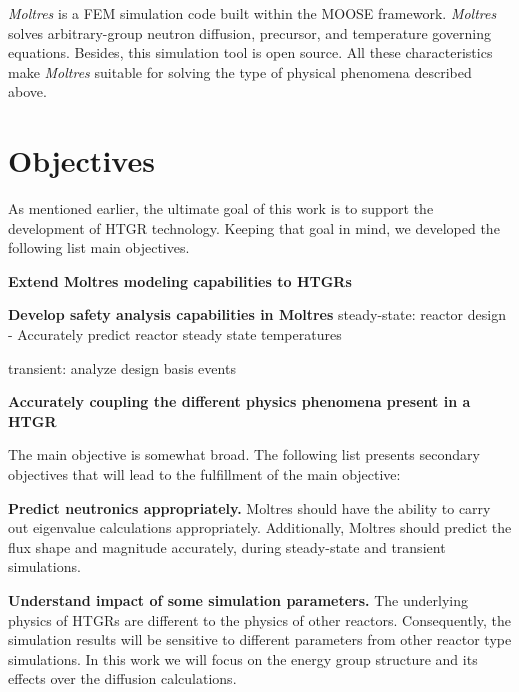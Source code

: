 \documentclass[11pt,letterpaper]{article}
\begin{document}
\textit{Moltres} \cite{lindsay_introduction_2018} is a \gls{FEM} simulation code built within the \gls{MOOSE} framework.
\textit{Moltres} solves arbitrary-group neutron diffusion, precursor, and temperature governing equations.
Besides, this simulation tool is open source.
All these characteristics make \textit{Moltres} suitable for solving the type of physical phenomena described above.

\section{Objectives}


As mentioned earlier, the ultimate goal of this work is to support the development of \gls{HTGR} technology.
Keeping that goal in mind, we developed the following list main objectives.


\textbf{Extend Moltres modeling capabilities to \glspl{HTGR}}

\textbf{Develop safety analysis capabilities in Moltres}
steady-state: reactor design
- Accurately predict reactor steady state temperatures

transient: analyze design basis events

\textbf{Accurately coupling the different physics phenomena present in a HTGR}



The main objective is somewhat broad.
The following list presents secondary objectives that will lead to the fulfillment of the main objective:

\textbf{Predict neutronics appropriately.}
Moltres should have the ability to carry out eigenvalue calculations appropriately.
Additionally, Moltres should predict the flux shape and magnitude accurately, during steady-state and transient simulations.

\textbf{Understand impact of some simulation parameters.}
The underlying physics of \glspl{HTGR} are different to the physics of other reactors.
Consequently, the simulation results will be sensitive to different parameters from other reactor type simulations.
In this work we will focus on the energy group structure and its effects over the diffusion calculations.
\end{document}
